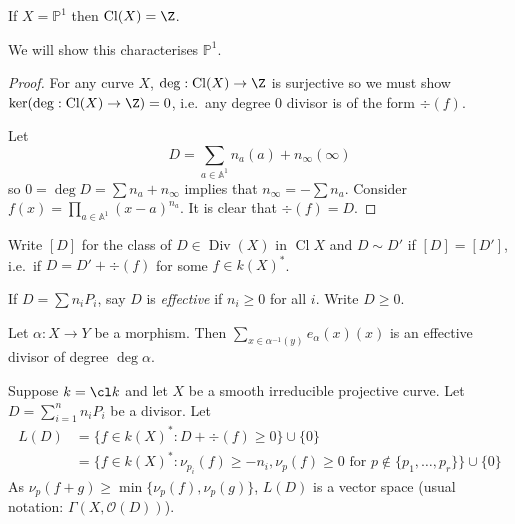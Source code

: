 \documentclass[a4paper]{article}
\renewcommand{\A}{\mathbb{A}}
\DeclareMathOperator{\Cl}{Cl}
\renewcommand*{\P}{\mathbb{P}}
\DeclareMathOperator{\Div}{Div} %
\begin{document}
\begin{proposition}
  If \(X = \P^1\) then \(\Cl (X) = \Z\).
\end{proposition}

\begin{remark}
  We will show this characterises \(\P^1\).
\end{remark}

\begin{proof}
  For any curve \(X\), \(\deg: \Cl(X) \to \Z\) is surjective so we must show \(\ker (\deg: \Cl(X) \to \Z) = 0\), i.e.\ any degree \(0\) divisor is of the form \(\div(f)\).

  Let
  \[
    D = \sum_{a \in \A^1} n_a (a) + n_\infty (\infty)
  \]
  so \(0 = \deg D = \sum n_a +n_\infty\) implies that \(n_\infty = -\sum n_a\). Consider \(f(x) = \prod_{a \in \A^1} (x - a)^{n_a}\). It is clear that \(\div (f) = D\).
\end{proof}

Write \([D]\) for the class of \(D \in \Div(X)\) in \(\Cl X\) and \(D \sim D'\) if \([D] = [D']\), i.e.\ if \(D = D' + \div (f)\) for some \(f \in k(X)^*\).

If \(D = \sum n_i P_i\), say \(D\) is \emph{effective} if \(n_i \geq 0\) for all \(i\). Write \(D \geq 0\).

\begin{eg}
  Let \(\alpha: X \to Y\) be a morphism. Then \(\sum_{x \in \alpha^{-1}(y)} e_\alpha(x) (x)\) is an effective divisor of degree \(\deg \alpha\).
\end{eg}

Suppose \(k = \cl k\) and let \(X\) be a smooth irreducible projective curve. Let \(D = \sum_{i = 1}^n n_i P_i\) be a divisor. Let
\begin{align*}
  L(D)
  &= \{f \in k(X)^*: D + \div (f) \geq 0\} \cup \{0\} \\
  &= \{f \in k(X)^*: \nu_{p_i}(f) \geq -n_i, \nu_p(f) \geq 0 \text{ for } p \notin \{p_1, \dots, p_r\}\} \cup \{0\}
\end{align*}
As \(\nu_p(f + g) \geq \min\{\nu_p(f), \nu_p(g)\}\), \(L(D)\) is a vector space (usual notation: \(\Gamma(X, \mathcal O(D))\)).

\begin{eg}\leavevmode
\end{eg}
\end{document}
